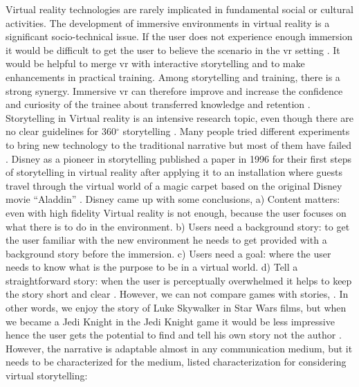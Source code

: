 Virtual reality technologies are rarely implicated in fundamental social or cultural activities. The development of immersive environments in virtual reality is a significant socio-technical issue. If the user does not experience enough immersion it would be difficult to get the user to believe the scenario in the \acrshort{vr} setting \citep{Darcy2003VirtualStorytelling, Steinicke2016}. It would be helpful to merge \acrlong{vr} with interactive storytelling and to make enhancements in practical training. Among storytelling and training, there is a strong synergy. Immersive \acrshort{vr} can therefore improve and increase the confidence and curiosity of the trainee about transferred knowledge and retention \citep{Ponder2003ImmersiveTraining}. Storytelling in Virtual reality is an intensive research topic, even though there are no clear guidelines for 360$^{\circ}$ storytelling \citep{Gugenheimer2016SwiVRChair:Reality, Ponder2003ImmersiveTraining}. Many people tried different experiments to bring new technology to the traditional narrative but most of them have failed \citep{Balet2003VirtualProceedings}. Disney as a pioneer in storytelling published a paper in 1996 for their first steps of storytelling in virtual reality after applying it to an installation where guests travel through the virtual world of a magic carpet based on the original Disney movie “Aladdin” \citep{Pausch1996DisneysReality}. Disney came up with some conclusions, a) Content matters: even with high fidelity Virtual reality is not enough, because the user focuses on what there is to do in the environment. b) Users need a background story: to get the user familiar with the new environment he needs to get provided with a background story before the immersion. c) Users need a goal: where the user needs to know what is the purpose to be in a virtual world. d) Tell a straightforward story: when the user is perceptually overwhelmed it helps to keep the story short and clear \citep{Pausch1996DisneysReality}. However, we can not compare games with stories, \cite [p.52]{Balet2003VirtualProceedings}. In other words, we enjoy the story of Luke Skywalker in Star Wars films, but when we became a Jedi Knight in the Jedi Knight game it would be less impressive hence the user gets the potential to find and tell his own story not the author \citep{Balet2003VirtualProceedings}. However, the narrative is adaptable almost in any communication medium, but it needs to be characterized for the medium, \citep{Balet2003VirtualProceedings} listed characterization for considering virtual storytelling:
